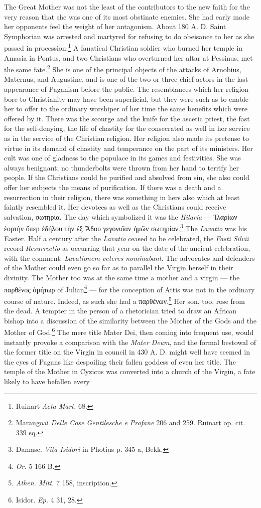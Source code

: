 \documentclass[a4paper, 11pt, oneside, polutonikogreek, english]{article}
\begin{document}
The Great Mother was not the least of the contributors to the new faith for the very reason that she was one of its most obstinate enemies. She had early made her opponents feel the weight of her antagonism. About 180 A. D. Saint Symphorian was arrested and martyred for refusing to do obeisance to her as she passed in procession.\footnote{Ruinart \emph{Acta Mart.} 68.} A fanatical Christian soldier who burned her temple in Amasia in Pontus, and two Christians who overturned her altar at Pessinus, met the same fate.\footnote{Marangoai \emph{Delle Cose Gentilesche e Profane} 206 and 259. Ruinart op. cit. 339 sq.} She is one of the principal objects of the attacks of Arnobius, Maternus, and Augustine, and is one of the two or three chief actors in the last appearance of Paganism before the public. The resemblances which her religion bore to Christianity may have been superficial, but they were such as to enable her to offer to the ordinary worshiper of her time the same benefits which were offered by it. There was the scourge and the knife for the ascetic priest, the fast for the self-denying, the life of chastity for the consecrated as well in her service as in the service of the Christian religion. Her religion also made its pretense to virtue in its demand of chastity and temperance on the part of its ministers. Her cult was one of gladness to the populace in its games and festivities. She was always benignant; no thunderbolts were thrown from her hand to terrify her people. If the Christians could be purified and absolved from sin, she also could offer her subjects the means of purification. If there was a death and a resurrection in their religion, there was something in hers also which at least faintly resembled it. Her devotees as well as the Christians could receive salvation, σωτηρία. The day which symbolized it was the \emph{Hilaria} --- Ἱλαρίων ἑορτὴν ὅπερ ἐδήλου τὴν ἐξ Ἄδου γεγονυῖαν ἡμῶν σωτηρίαν.\footnote{Damasc. \emph{Vita Isidori} in Photius p. 345 a, Bekk.} The \emph{Lavatio} was his Easter. Half a century after the \emph{Lavatio} ceased to be celebrated, the \emph{Fasti Silvii} record \emph{Resurrectio} as occurring that year on the date of the ancient celebration, with the comment: \emph{Lavationem veteres nominabant}. The advocates and defenders of the Mother could even go so far as to parallel the Virgin herself in their divinity. The Mother too was at the same time a mother and a virgin --- the παρθένος ἀμήτωρ of Julian\footnote{\emph{Or.} 5 166 B.} --- for the conception of Attis was not in the ordinary course of nature. Indeed, as such she had a παρθένων.\footnote{\emph{Athen. Mitt.} 7 158, inscription.} Her son, too, rose from the dead. A tempter in the person of a rhetorician tried to draw an African bishop into a discussion of the similarity between the Mother of the Gods and the Mother of God.\footnote{Isidor. \emph{Ep.} 4 31, 28.} The mere title Mater Dei, then coming into frequent use, would instantly provoke a comparison with the \emph{Mater Deum}, and the formal bestowal of the former title on the Virgin in council in 430 A. D. might well have seemed in the eyes of Pagans like despoiling their fallen goddess of even her title. The temple of the Mother in Cyzicus was converted into a church of the Virgin, a fate likely to have befallen every 
\end{document}
